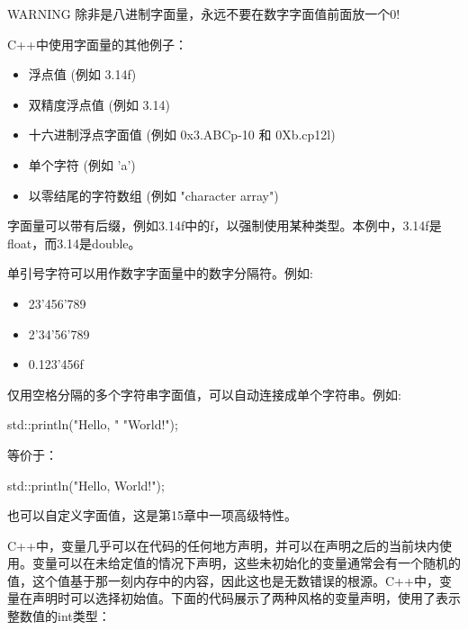 \begin{myWarning}{WARNING}
除非是八进制字面量，永远不要在数字字面值前面放一个0!
\end{myWarning}

C++中使用字面量的其他例子：

\begin{itemize}
\item
浮点值 (例如 3.14f)

\item
双精度浮点值 (例如 3.14)

\item
十六进制浮点字面值 (例如 0x3.ABCp-10 和 0Xb.cp12l)

\item
单个字符 (例如 'a')

\item
以零结尾的字符数组 (例如 "character array")
\end{itemize}

字面量可以带有后缀，例如3.14f中的f，以强制使用某种类型。本例中，3.14f是float，而3.14是double。

单引号字符可以用作数字字面量中的数字分隔符。例如:

\begin{itemize}
\item
23'456'789

\item
2'34'56'789

\item
0.123'456f
\end{itemize}

仅用空格分隔的多个字符串字面值，可以自动连接成单个字符串。例如:

\begin{cpp}
std::println("Hello, "
             "World!");
\end{cpp}

等价于：

\begin{cpp}
std::println("Hello, World!");
\end{cpp}

也可以自定义字面值，这是第15章中一项高级特性。


C++中，变量几乎可以在代码的任何地方声明，并可以在声明之后的当前块内使用。变量可以在未给定值的情况下声明，这些未初始化的变量通常会有一个随机的值，这个值基于那一刻内存中的内容，因此这也是无数错误的根源。C++中，变量在声明时可以选择初始值。下面的代码展示了两种风格的变量声明，使用了表示整数值的int类型：

